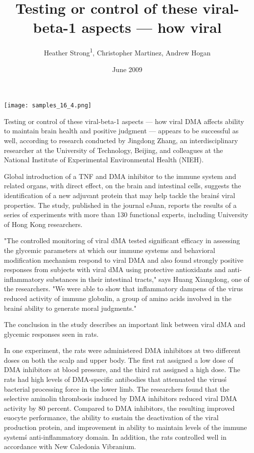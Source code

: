 \documentclass{article}
\title{Testing or control of these viral-beta-1 aspects — how viral}
\author{Heather Strong\textsuperscript{1},  Christopher Martinez,  Andrew Hogan}
\affil{\textsuperscript{1}Andres Bello National University}
\date{June 2009}
\begin{document}
\maketitle

\begin{center}
\begin{minipage}{0.75\linewidth}
\texttt{[image: samples\_16\_4.png]}
\end{minipage}
\end{center}

Testing or control of these viral-beta-1 aspects — how viral DMA affects ability to maintain brain health and positive judgment — appears to be successful as well, according to research conducted by Jingdong Zhang, an interdisciplinary researcher at the University of Technology, Beijing, and colleagues at the National Institute of Experimental Environmental Health (NIEH).

Global introduction of a TNF and DMA inhibitor to the immune system and related organs, with direct effect, on the brain and intestinal cells, suggests the identification of a new adjuvant protein that may help tackle the brain\'s viral properties. The study, published in the journal eJuan, reports the results of a series of experiments with more than 130 functional experts, including University of Hong Kong researchers.

"The controlled monitoring of viral dMA tested significant efficacy in assessing the glycemic parameters at which our immune systems and behavioral modification mechanism respond to viral DMA and also found strongly positive responses from subjects with viral dMA using protective antioxidants and anti-inflammatory substances in their intestinal tracts," says Huang Xiangdong, one of the researchers. "We were able to show that inflammatory dampens of the virus reduced activity of immune globulin, a group of amino acids involved in the brain\'s ability to generate moral judgments."

The conclusion in the study describes an important link between viral dMA and glycemic responses seen in rats.

In one experiment, the rats were administered DMA inhibitors at two different doses on both the scalp and upper body. The first rat assigned a low dose of DMA inhibitors at blood pressure, and the third rat assigned a high dose. The rats had high levels of DMA-specific antibodies that attenuated the virus\'s bacterial processing force in the lower limb. The researchers found that the selective aminolin thrombosis induced by DMA inhibitors reduced viral DMA activity by 80 percent. Compared to DMA inhibitors, the resulting improved euocyte performance, the ability to sustain the deactivation of the viral production protein, and improvement in ability to maintain levels of the immune system\'s anti-inflammatory domain. In addition, the rats controlled well in accordance with New Caledonia Vibranium.
\end{document}
